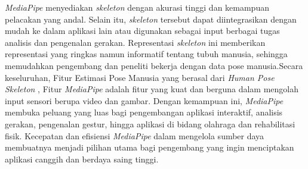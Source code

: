 \textit{MediaPipe} menyediakan \textit{skeleton} dengan akurasi tinggi dan kemampuan pelacakan yang andal. Selain itu, \textit{skeleton} tersebut dapat diintegrasikan dengan mudah ke dalam aplikasi lain atau digunakan sebagai input berbagai tugas analisis dan pengenalan gerakan. Representasi \textit{skeleton} ini memberikan representasi yang ringkas namun informatif tentang tubuh manusia, sehingga memudahkan pengembang dan peneliti bekerja dengan data pose manusia.Secara keseluruhan, Fitur Estimasi Pose Manusia yang berasal dari \textit{Human Pose Skeleton} , Fitur \textit{MediaPipe} adalah fitur yang kuat dan berguna dalam mengolah input sensori berupa video dan gambar. Dengan kemampuan ini, \textit{MediaPipe} membuka peluang yang luas bagi pengembangan aplikasi interaktif, analisis gerakan, pengenalan gestur, hingga aplikasi di bidang olahraga dan rehabilitasi fisik. Kecepatan dan efisiensi \textit{MediaPipe} dalam mengelola sumber daya membuatnya menjadi pilihan utama bagi pengembang yang ingin menciptakan aplikasi canggih dan berdaya saing tinggi.

